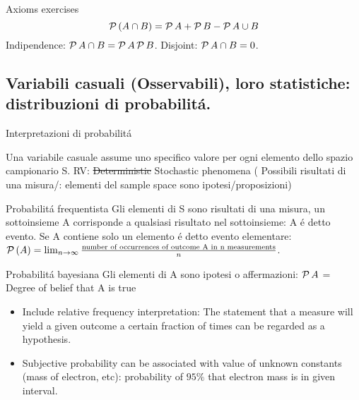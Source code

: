 \begin{wordonframe}{Axioms exercises}
\[\operatorname{\mathcal{P}}{(A\cap B)}=\operatorname{\mathcal{P}}{A}+\operatorname{\mathcal{P}}{B}-\operatorname{\mathcal{P}}{A\cup B}\]
Indipendence: $\operatorname{\mathcal{P}}{A\cap B}=\operatorname{\mathcal{P}}{A}\operatorname{\mathcal{P}}{B}$.
Disjoint: $\operatorname{\mathcal{P}}{A\cap B}=0$.
\end{wordonframe}

\subsection{Variabili casuali (Osservabili), loro statistiche: distribuzioni di probabilit\'a.}

\begin{frame}{Interpretazioni di probabilit\'a}
\begin{block}{Una variabile casuale assume uno specifico valore per ogni elemento dello spazio campionario S.}
RV: \sout{Deterministic} Stochastic phenomena ( Possibili risultati di una misura/: elementi del sample space sono ipotesi/proposizioni)
\end{block}
\begin{block}{Probabilit\'a frequentista}
Gli elementi di S sono risultati di una misura, un sottoinsieme A corrisponde a qualsiasi risultato nel sottoinsieme: A \'e detto evento. Se A contiene solo un elemento \'e detto evento elementare: $\operatorname{\mathcal{P}}{(A)}=\lim_{n\to\infty}\frac{\text{number of occurrences of outcome A in n measurements}}{n}$.
\end{block}
\begin{block}{Probabilit\'a bayesiana}
Gli elementi di A sono ipotesi o affermazioni: $\operatorname{\mathcal{P}}{A}$ = Degree of belief that A is true
\begin{itemize}
\item Include relative frequency interpretation: The statement that a measure will yield a given outcome a certain fraction of times can be regarded as a hypothesis.
\item Subjective probability can be associated with value of unknown constants (mass of electron, etc): probability of $95\%$ that electron mass is in given interval.
\end{itemize}
\end{block}
\end{frame}

